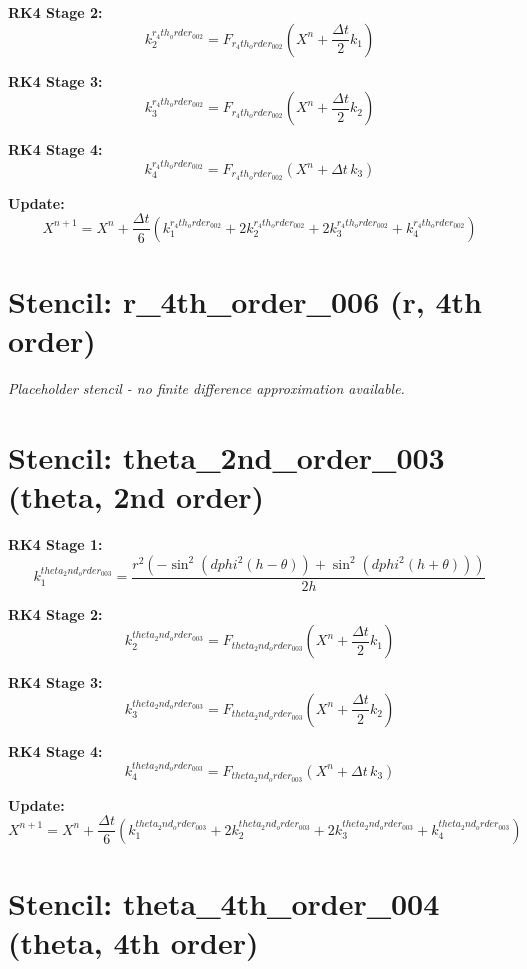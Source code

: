 \documentclass{article}
\begin{document}
\textbf{RK4 Stage 2:}
\[
k_2^{r_4th_order_002} = F_{r_4th_order_002}\left(X^n + \frac{\Delta t}{2} k_1\right)
\]

\textbf{RK4 Stage 3:}
\[
k_3^{r_4th_order_002} = F_{r_4th_order_002}\left(X^n + \frac{\Delta t}{2} k_2\right)
\]

\textbf{RK4 Stage 4:}
\[
k_4^{r_4th_order_002} = F_{r_4th_order_002}\left(X^n + \Delta t \, k_3\right)
\]

\textbf{Update:}
\[
X^{n+1} = X^n + \frac{\Delta t}{6} \left(k_1^{r_4th_order_002} + 2k_2^{r_4th_order_002} + 2k_3^{r_4th_order_002} + k_4^{r_4th_order_002}\right)
\]

\pagebreak

\section*{Stencil: r_4th_order_006 (r, 4th order)}

\textit{Placeholder stencil - no finite difference approximation available.}

\section*{Stencil: theta_2nd_order_003 (theta, 2nd order)}

\textbf{RK4 Stage 1:}
\[
k_1^{theta_2nd_order_003} = \frac{r^{2} \left(- \sin^{2}{\left(dphi^{2} \left(h - \theta\right) \right)} + \sin^{2}{\left(dphi^{2} \left(h + \theta\right) \right)}\right)}{2 h}
\]

\textbf{RK4 Stage 2:}
\[
k_2^{theta_2nd_order_003} = F_{theta_2nd_order_003}\left(X^n + \frac{\Delta t}{2} k_1\right)
\]

\textbf{RK4 Stage 3:}
\[
k_3^{theta_2nd_order_003} = F_{theta_2nd_order_003}\left(X^n + \frac{\Delta t}{2} k_2\right)
\]

\textbf{RK4 Stage 4:}
\[
k_4^{theta_2nd_order_003} = F_{theta_2nd_order_003}\left(X^n + \Delta t \, k_3\right)
\]

\textbf{Update:}
\[
X^{n+1} = X^n + \frac{\Delta t}{6} \left(k_1^{theta_2nd_order_003} + 2k_2^{theta_2nd_order_003} + 2k_3^{theta_2nd_order_003} + k_4^{theta_2nd_order_003}\right)
\]

\pagebreak

\section*{Stencil: theta_4th_order_004 (theta, 4th order)}
\end{document}
